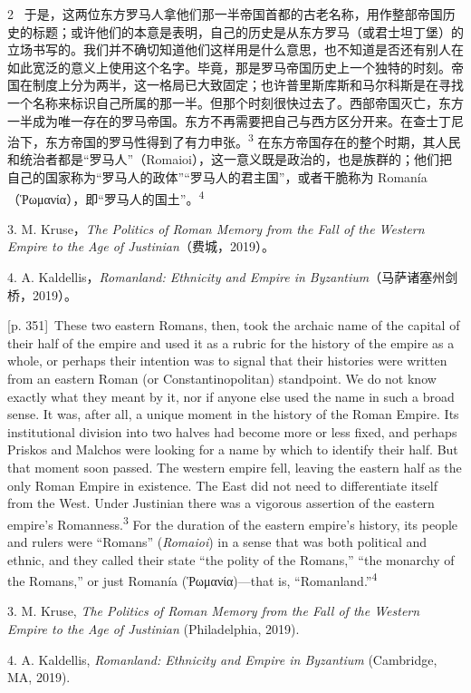 \documentclass[10pt,a4paper]{article}
\begin{document}
\begin{paracol}{2}
\switchcolumn*
{\scriptsize\color{gray}[p. 351]}\ 于是，这两位东方罗马人拿他们那一半帝国首都的古老名称，用作整部帝国历史的标题；或许他们的本意是表明，自己的历史是从东方罗马（或君士坦丁堡）的立场书写的。我们并不确切知道他们这样用是什么意思，也不知道是否还有别人在如此宽泛的意义上使用这个名字。毕竟，那是罗马帝国历史上一个独特的时刻。帝国在制度上分为两半，这一格局已大致固定；也许普里斯库斯和马尔科斯是在寻找一个名称来标识自己所属的那一半。但那个时刻很快过去了。西部帝国灭亡，东方一半成为唯一存在的罗马帝国。东方不再需要把自己与西方区分开来。在查士丁尼治下，东方帝国的罗马性得到了有力申张。\nobreak\textsuperscript{3} 在东方帝国存在的整个时期，其人民和统治者都是“罗马人”（Romaioi），这一意义既是政治的，也是族群的；他们把自己的国家称为“罗马人的政体”“罗马人的君主国”，或者干脆称为 Romanía（Ῥωμανία），即“罗马人的国土”。\nobreak\textsuperscript{4}\par{\small 3. M. Kruse，\textit{The Politics of Roman Memory from the Fall of the Western Empire to the Age of Justinian}（费城，2019）。\par}{\small 4. A. Kaldellis，\textit{Romanland: Ethnicity and Empire in Byzantium}（马萨诸塞州剑桥，2019）。\par}
\switchcolumn
{\scriptsize\color{gray}[p. 351]}\ These two eastern Romans, then, took the archaic name of the capital of their half of the empire and used it as a rubric for the history of the empire as a whole, or perhaps their intention was to signal that their histories were written from an eastern Roman (or Constantinopolitan) standpoint. We do not know exactly what they meant by it, nor if anyone else used the name in such a broad sense. It was, after all, a unique moment in the history of the Roman Empire. Its institutional division into two halves had become more or less fixed, and perhaps Priskos and Malchos were looking for a name by which to identify their half. But that moment soon passed. The western empire fell, leaving the eastern half as the only Roman Empire in existence. The East did not need to differentiate itself from the West. Under Justinian there was a vigorous assertion of the eastern empire’s Romanness.\nobreak\textsuperscript{3} For the duration of the eastern empire’s history, its people and rulers were “Romans” (\textit{Romaioi}) in a sense that was both political and ethnic, and they called their state “the polity of the Romans,” “the monarchy of the Romans,” or just Romanía (Ῥωμανία)—that is, “Romanland.”\nobreak\textsuperscript{4}\par{\small 3.  M. Kruse, \textit{The Politics of Roman Memory from the Fall of the Western Empire to the Age of Justinian} (Philadelphia, 2019).\par}{\small 4.  A. Kaldellis, \textit{Romanland: Ethnicity and Empire in Byzantium} (Cambridge, MA, 2019).\par}

\end{paracol}
\end{document}
